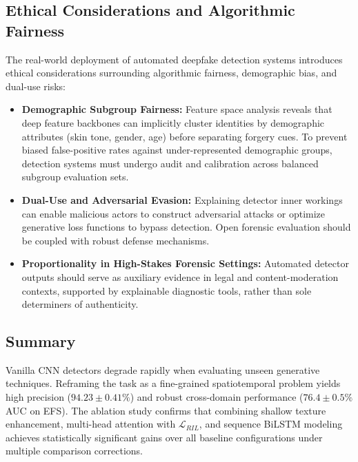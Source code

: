 \subsection{Ethical Considerations and Algorithmic Fairness}
The real-world deployment of automated deepfake detection systems introduces ethical considerations surrounding algorithmic fairness, demographic bias, and dual-use risks:
\begin{itemize}
    \item \textbf{Demographic Subgroup Fairness:} Feature space analysis reveals that deep feature backbones can implicitly cluster identities by demographic attributes (skin tone, gender, age) before separating forgery cues. To prevent biased false-positive rates against under-represented demographic groups, detection systems must undergo audit and calibration across balanced subgroup evaluation sets.
    \item \textbf{Dual-Use and Adversarial Evasion:} Explaining detector inner workings can enable malicious actors to construct adversarial attacks or optimize generative loss functions to bypass detection. Open forensic evaluation should be coupled with robust defense mechanisms.
    \item \textbf{Proportionality in High-Stakes Forensic Settings:} Automated detector outputs should serve as auxiliary evidence in legal and content-moderation contexts, supported by explainable diagnostic tools, rather than sole determiners of authenticity.
\end{itemize}

\subsection{Summary}
Vanilla CNN detectors degrade rapidly when evaluating unseen generative techniques. Reframing the task as a fine-grained spatiotemporal problem yields high precision ($94.23 \pm 0.41\%$) and robust cross-domain performance ($76.4 \pm 0.5\%$ AUC on EFS). The ablation study confirms that combining shallow texture enhancement, multi-head attention with $\mathcal{L}_{RIL}$, and sequence BiLSTM modeling achieves statistically significant gains over all baseline configurations under multiple comparison corrections.
